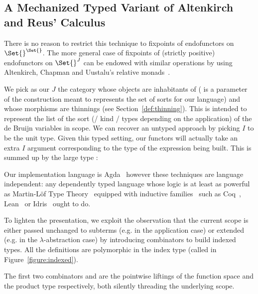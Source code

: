 \subsection{A Mechanized Typed Variant of Altenkirch and Reus' Calculus}

There is no reason to restrict this technique to fixpoints of endofunctors
on $\Set{}^{\Set{}}$. The more general
case of fixpoints of (strictly positive) endofunctors on $\Set{}^J$ can be
endowed with similar operations by using Altenkirch, Chapman and
Uustalu's relative monads~\citeyear{Altenkirch2010, JFR4389}.

We pick as our $J$ the category whose objects are inhabitants of  
( is a parameter of the construction meant to represents the set of sorts for
our language) and whose morphisms are thinnings (see Section~\ref{def:thinning}).
This   is intended to represent the list
of the sort (/ kind / types depending on the application) of the de Bruijn variables
in scope. We can recover an untyped approach by picking $I$ to be the unit type.
Given this typed setting, our functors will actually take an extra $I$ argument
corresponding to the type of the expression being built. This is summed up by
the large type :

\begin{center}
\end{center}

Our implementation language is Agda~\cite{norell2009dependently} however
these techniques are language independent: any dependently typed language
whose logic is at least as powerful as Martin-L\"of Type
Theory~\cite{martin1982constructive} equipped with inductive
families~\cite{dybjer1994inductive} such as Coq~\cite{Coq:manual},
Lean~\cite{DBLP:conf/cade/MouraKADR15} or Idris~\cite{brady2013idris} ought to do.

To lighten the presentation, we exploit the observation that the
current scope is either passed unchanged to subterms (e.g. in the application case)
or extended (e.g. in the $\lambda$-abstraction case) by introducing combinators
to build indexed types. All the definitions are polymorphic in the index type
(called  in Figure~\ref{figure:indexed}).

The first two combinators  and  are the pointwise liftings
of the function space and the product type respectively, both silently threading
the underlying scope.

